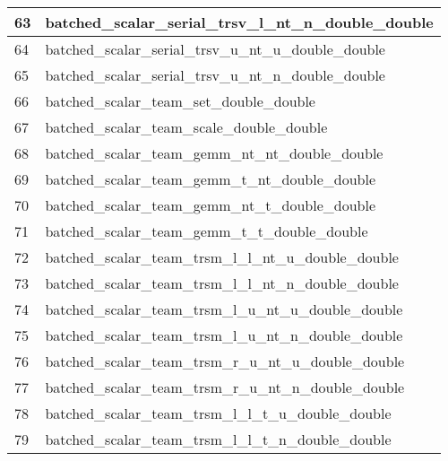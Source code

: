 \begin{table}[!htbp]
{\begin{tabular}{|>{\columncolor[HTML]{34FF34}}l |l|}
            \cellcolor[HTML]{FE0000}63 & batched\_scalar\_serial\_trsv\_l\_nt\_n\_double\_double             \\ \hline
            64                         & batched\_scalar\_serial\_trsv\_u\_nt\_u\_double\_double             \\ \hline
            \cellcolor[HTML]{FE0000}65 & batched\_scalar\_serial\_trsv\_u\_nt\_n\_double\_double             \\ \hline
            \cellcolor[HTML]{FE0000}66 & batched\_scalar\_team\_set\_double\_double                          \\ \hline
            67                         & batched\_scalar\_team\_scale\_double\_double                        \\ \hline
            \cellcolor[HTML]{F8FF00}68 & batched\_scalar\_team\_gemm\_nt\_nt\_double\_double                 \\ \hline
            \cellcolor[HTML]{F8FF00}69 & batched\_scalar\_team\_gemm\_t\_nt\_double\_double                  \\ \hline
            \cellcolor[HTML]{F8FF00}70 & batched\_scalar\_team\_gemm\_nt\_t\_double\_double                  \\ \hline
            71                         & batched\_scalar\_team\_gemm\_t\_t\_double\_double                   \\ \hline
            72                         & batched\_scalar\_team\_trsm\_l\_l\_nt\_u\_double\_double            \\ \hline
            73                         & batched\_scalar\_team\_trsm\_l\_l\_nt\_n\_double\_double            \\ \hline
            74                         & batched\_scalar\_team\_trsm\_l\_u\_nt\_u\_double\_double            \\ \hline
            \cellcolor[HTML]{FE0000}75 & batched\_scalar\_team\_trsm\_l\_u\_nt\_n\_double\_double            \\ \hline
            76                         & batched\_scalar\_team\_trsm\_r\_u\_nt\_u\_double\_double            \\ \hline
            \cellcolor[HTML]{FE0000}77 & batched\_scalar\_team\_trsm\_r\_u\_nt\_n\_double\_double            \\ \hline
            \cellcolor[HTML]{FF00FF}78 & batched\_scalar\_team\_trsm\_l\_l\_t\_u\_double\_double             \\ \hline
            \cellcolor[HTML]{FF00FF}79 & batched\_scalar\_team\_trsm\_l\_l\_t\_n\_double\_double             \\ \hline

\end{tabular}}
\end{table}

